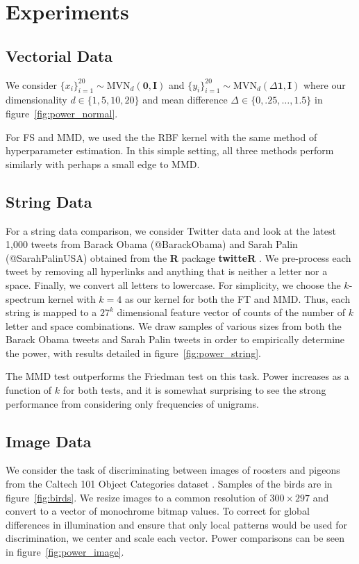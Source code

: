 \section{Experiments}
\subsection{Vectorial Data}
We consider $\{x_i\}_{i=1}^{20} \sim \mathrm{MVN}_d(\mathbf{0},
\mathbf{I})$ and $\{y_i\}_{i=1}^{20} \sim
\mathrm{MVN}_d(\Delta \mathbf{1}, \mathbf{I})$ where our
dimensionality $d \in \{1, 5, 10, 20\}$ and mean difference $\Delta \in
\{0, .25, \ldots, 1.5\}$ in figure~\ref{fig:power_normal}.

For FS and MMD, we used the the RBF kernel with the same method of
hyperparameter estimation.  In this simple setting, all three methods
perform similarly with perhaps a small edge to MMD.

\subsection{String Data}
\label{twitter_data}
For a string data comparison, we consider Twitter data and look at the
latest 1,000 tweets from Barack Obama (@BarackObama) and Sarah Palin
(@SarahPalinUSA) obtained from the {\bf R} package {\bf twitteR}
\cite{twitteR}.  We pre-process each tweet by removing all
hyperlinks and anything that is neither a letter nor a space.
Finally, we convert all letters to lowercase.  For simplicity, we
choose the $k$-spectrum kernel \cite{leslie2002spectrum} with $k=4$ 
as our kernel for both the FT and MMD.  Thus, each string is mapped to
a $27^k$ dimensional feature vector of counts of the number of $k$
letter and space combinations.  We draw samples of various sizes from
both the Barack Obama tweets and Sarah Palin tweets in order to
empirically determine the power, with results detailed in
figure~\ref{fig:power_string}.

The MMD test outperforms the Friedman test on this task.  Power
increases as a function of $k$ for both tests, and it is somewhat
surprising to see the strong performance from considering only
frequencies of unigrams.

\subsection{Image Data}
We consider the task of discriminating between images of roosters and
pigeons from the Caltech 101 Object Categories dataset
\cite{fei2007learning}.  Samples of the birds are in figure~\ref{fig:birds}.
We resize images to a common resolution of $300 \times
297$ and convert to a vector of monochrome bitmap values.  
To correct for global differences in illumination and ensure
that only local patterns would be used for discrimination, we center and
scale each vector.  Power comparisons can be seen in figure~\ref{fig:power_image}.

